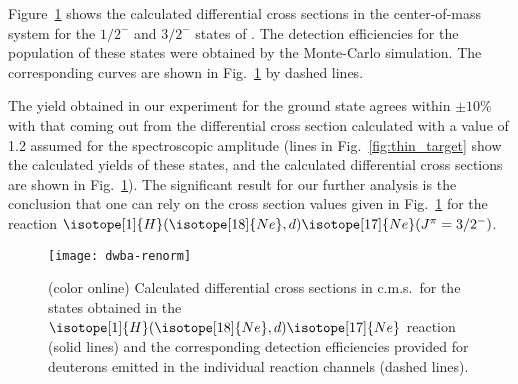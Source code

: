 \documentclass[superscriptaddress,showpacs,showkeys,twoside,floatfix,twocolumn]
{revtex4-1}
\begin{document}
Figure~\ref{fig:cross-sec} shows the calculated differential cross sections
in the center-of-mass system for the $1/2^-$ and $3/2^-$ states of .
The detection efficiencies for the population of these states were obtained
by the Monte-Carlo simulation.
The corresponding curves are shown in Fig.~\ref{fig:cross-sec} by dashed lines.


The yield obtained in our experiment for the  ground state
agrees within $\pm 10\%$ with that coming out from the differential
cross section calculated with a value of 1.2 assumed for the spectroscopic amplitude
(lines in Fig.~\ref{fig:thin_target} show the calculated yields of these states,
and the calculated differential cross sections are shown in Fig.~\ref{fig:cross-sec}).
The significant result for our further analysis is the conclusion that one can rely on
the cross section values given in Fig.~\ref{fig:cross-sec} for the reaction
\(\isotope[1]{H}(\isotope[18]{Ne},d)\isotope[17]{Ne}(J^\pi=3/2^-)\).

\begin{figure}[htb]
  \centering
  \texttt{[image: dwba-renorm]}
  \caption{\label{fig:cross-sec} (color online)
    Calculated differential cross sections in c.m.s.\ for the
     states obtained in the
    $\isotope[1]{H}(\isotope[18]{Ne},d)\isotope[17]{Ne}$ reaction (solid lines)
    and the corresponding detection efficiencies provided for deuterons
    emitted in the individual reaction channels (dashed lines).}
\end{figure}
\end{document}
